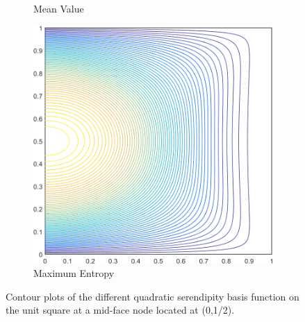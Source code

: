 \begin{figure}
\begin{subfigure}[b]{0.39\textwidth}
		\caption{Mean Value}
	\end{subfigure}
	\hspace{1.5cm}
	\begin{subfigure}[b]{0.39\textwidth}
		\centering
		\includegraphics[width=\textwidth]{figures/sec_BF/square_MAXENT2_contour_b8.png}
		\caption{Maximum Entropy}
	\end{subfigure}
\caption{Contour plots of the different quadratic serendipity basis function on the unit square at a mid-face node located at (0,1/2).}
\label{fig::2D_Quadratic_Summary_unit_square_basis_functions_BF8}
\end{figure}



